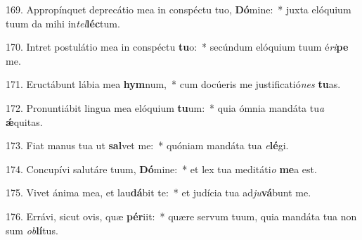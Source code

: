 169. Appropínquet deprecátio mea in conspéctu tuo, \textbf{Dó}mine:~*  juxta elóquium tuum da mihi in\textit{tel}\textbf{léc}tum.\

170. Intret postulátio mea in conspéctu \textbf{tu}o:~*  secúndum elóquium tuum é\textit{ri}\textbf{pe} me.\

171. Eructábunt lábia mea \textbf{hym}num,~*  cum docúeris me justificatió\textit{nes} \textbf{tu}as.\

172. Pronuntiábit lingua mea elóquium \textbf{tu}um:~*  quia ómnia mandáta tu\textit{a} \textbf{ǽ}quitas.\

173. Fiat manus tua ut \textbf{sal}vet me:~*  quóniam mandáta tua \textit{e}\textbf{lé}gi.\

174. Concupívi salutáre tuum, \textbf{Dó}mine:~*  et lex tua meditáti\textit{o} \textbf{me}a est.\

175. Vivet ánima mea, et lau\textbf{dá}bit te:~*  et judícia tua ad\textit{ju}\textbf{vá}bunt me.\

176. Errávi, sicut ovis, quæ \textbf{pér}iit:~*  quære servum tuum, quia mandáta tua non sum \textit{ob}\textbf{lí}tus.\

